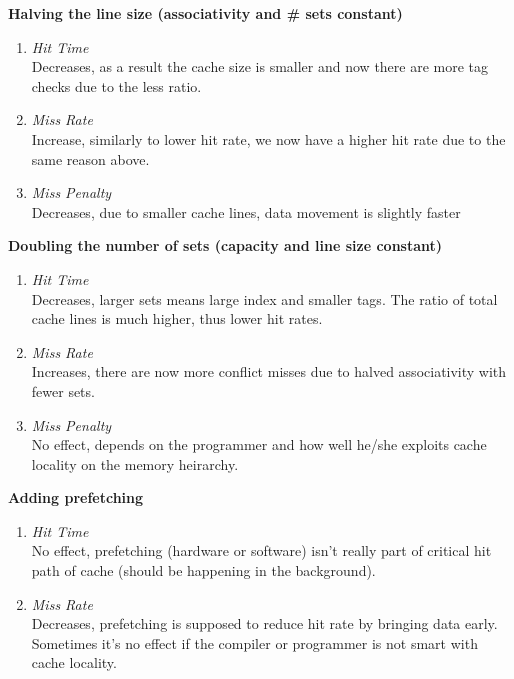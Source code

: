 \documentclass[11pt]{article}
\begin{document}
\begin{Parts}
	\Part \textbf{Halving the line size (associativity and
\# sets constant)} \\
		\begin{enumerate}[i]
			\item \textit{Hit Time} \\
				Decreases, as a result the cache size is smaller and now there are more tag checks due to the less ratio.
			\item \textit{Miss Rate} \\
				Increase, similarly to lower hit rate, we now have a higher hit rate due to the same reason above.
			\item \textit{Miss Penalty} \\
				Decreases, due to smaller cache lines, data movement is slightly faster
		\end{enumerate}
	\Part \textbf{Doubling the number of sets (capacity and line size constant)} \\
		\begin{enumerate}[i]
			\item \textit{Hit Time} \\
				Decreases, larger sets means large index and smaller tags. The ratio of total cache lines is much higher, thus lower hit rates.
			\item \textit{Miss Rate} \\
				Increases, there are now more conflict misses due to halved associativity with fewer sets.
			\item \textit{Miss Penalty} \\
				No effect, depends on the programmer and how well he/she exploits cache locality on the memory heirarchy.
		\end{enumerate}
	\Part \textbf{Adding prefetching} \\
		\begin{enumerate}[i]
			\item \textit{Hit Time} \\
				No effect, prefetching (hardware or software) isn't really part of critical hit path of cache (should be happening in the background).
			\item \textit{Miss Rate} \\
				Decreases, prefetching is supposed to reduce hit rate by bringing data early. Sometimes it's no effect if the compiler or programmer is not smart with cache locality.

\end{enumerate}
\end{Parts}
\end{document}
